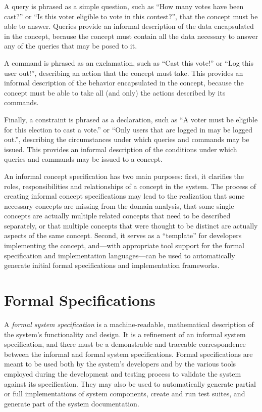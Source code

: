 A query is phrased as a simple question, such as ``How many votes have
been cast?'' or ``Is this voter eligible to vote in this contest?'',
that the concept must be able to answer. Queries provide an informal
description of the data encapsulated in the concept, because the
concept must contain all the data necessary to answer any of the
queries that may be posed to it.

A command is phrased as an exclamation, such as ``Cast this vote!'' or
``Log this user out!'', describing an action that the concept must
take. This provides an informal description of the behavior
encapsulated in the concept, because the concept must be able to take
all (and only) the actions described by its commands.

Finally, a constraint is phrased as a declaration, such as ``A voter
must be eligible for this election to cast a vote.'' or ``Only users
that are logged in may be logged out.'', describing the circumstances
under which queries and commands may be issued. This provides an
informal description of the conditions under which queries and
commands may be issued to a concept. 

An informal concept specification has two main purposes: first, it
clarifies the roles, responsibilities and relationships of a concept
in the system. The process of creating informal concept specifications
may lead to the realization that some necessary concepts are missing
from the domain analysis, that some single concepts are actually
multiple related concepts that need to be described separately, or
that multiple concepts that were thought to be distinct are actually
aspects of the same concept. Second, it serves as a ``template'' for
developers implementing the concept, and---with appropriate tool
support for the formal specification and implementation
languages---can be used to automatically generate initial formal
specifications and implementation frameworks.

\section{Formal Specifications}

A \emph{formal system specification} is a machine-readable,
mathematical description of the system's functionality and design. It
is a refinement of an informal system specification, and there must be
a demonstrable and traceable correspondence between the informal and
formal system specifications. Formal specifications are meant to be
used both by the system's developers and by the various tools employed
during the development and testing process to validate the system
against its specification. They may also be used to automatically
generate partial or full implementations of system components, create
and run test suites, and generate part of the system documentation.

